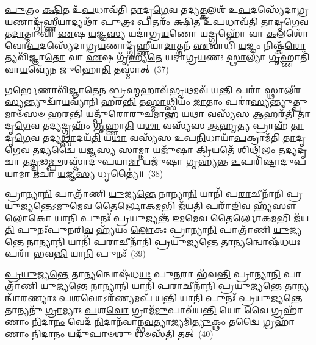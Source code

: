 \-\ul{𑌪𑍁}\-𑌤𑍍𑌰𑌂 \ul{𑌕𑍍𑌷𑌿}\-𑌤 𑌉᳴\-\ul{𑌪}\-𑌧𑌾𑌵᳴𑌤𑌿 \ul{𑌤𑌾}\-𑌦𑍃\-\ul{𑌗𑍇}\-𑌵 𑌤𑌦𑍍𑌯\-\ul{𑌤𑍍𑌕}\-𑌲𑌶᳴ 𑌉\-\ul{𑌪}\-𑌦𑌸𑍍𑌯𑍇᳴𑌦𑌾𑌗𑍍𑌰\-\ul{𑌯}\-𑌣𑌾𑌦𑍍𑌗𑍃᳴𑌹𑍍𑌣𑍀\-\ul{𑌯𑌾}\-𑌦𑍍𑌯𑌥𑌾᳴ \ul{𑌪𑍁}\-𑌤𑍍𑌰𑌃 \ul{𑌪𑌿}\-𑌤𑌰𑌂᳴ \ul{𑌕𑍍𑌷𑌿}\-𑌤 𑌉᳴\-\ul{𑌪}\-𑌧𑌾𑌵᳴𑌤𑌿 \ul{𑌤𑌾}\-𑌦𑍃\-\ul{𑌗𑍇}\-𑌵 𑌤\-\ul{𑌦𑌾}\-𑌤𑍍𑌮𑌾 𑌵𑌾 \ul{𑌏}\-𑌷 \ul{𑌯}\-𑌜𑍍𑌞\-\ul{𑌸𑍍𑌯} 𑌯𑌦𑌾॑𑌗𑍍𑌰\-\ul{𑌯}\-𑌣𑍋 𑌯𑌦𑍍𑌗𑍍𑌰𑌹𑍋᳴ 𑌵𑌾 \ul{𑌕}\-𑌲𑌶𑍋᳴ 𑌵𑍋\-\ul{𑌪}\-𑌦𑌸𑍍𑌯𑍇᳴𑌦𑌾𑌗𑍍𑌰\-\ul{𑌯}\-𑌣𑌾𑌦𑍍𑌗𑍃᳴𑌹𑍍𑌣𑍀𑌯𑌾\-\ul{𑌦𑌾}\-𑌤𑍍𑌮𑌨᳴ \ul{𑌏}\-𑌵𑌾𑌧𑌿᳴ \ul{𑌯}\-𑌜𑍍𑌞𑌂 𑌨𑌿𑌷𑍍𑌕᳴\-\ul{𑌰𑍋}\-𑌤𑍍𑌯𑌵𑌿᳴𑌜𑍍𑌞𑌾\-\ul{𑌤𑍋} 𑌵𑌾 \ul{𑌏}\-𑌷 𑌗𑍃᳴𑌹𑍍𑌯\-\ul{𑌤𑍇} 𑌯𑌦𑌾॑𑌗𑍍𑌰\-\ul{𑌯}\-𑌣𑌃 \ul{𑌸𑍍𑌥𑌾}\-𑌲𑍍𑌯𑌾 \ul{𑌗𑍃}\-𑌹𑍍𑌣𑌾𑌤𑌿᳴ 𑌵𑌾\-\ul{𑌯}\-𑌵𑍍𑌯𑍇᳴𑌨 𑌜𑍁𑌹𑍋\-\ul{𑌤𑌿} 𑌤𑌸𑍍𑌮𑌾॑𑌤𑍍~(37)

𑌗\-\ul{𑌰𑍍𑌭𑍇}\-𑌣𑌾𑌵𑌿᳴𑌜𑍍𑌞𑌾𑌤𑍇𑌨 𑌬𑍍𑌰\-\ul{𑌹𑍍𑌮}\-𑌹𑌾𑌵᳴\-\ul{𑌭𑍃}\-𑌥𑌮𑌵᳴ 𑌯\-\ul{𑌨𑍍𑌤𑌿} 𑌪𑌰𑌾॑ \ul{𑌸𑍍𑌥𑌾}\-𑌲𑍀𑌰\-\ul{𑌸𑍍𑌯}\-𑌨𑍍𑌤𑍍𑌯𑍁𑌦𑍍𑌵𑌾᳴\-\ul{𑌯}\-𑌵𑍍𑌯𑌾᳴𑌨𑌿 𑌹𑌰\-\ul{𑌨𑍍𑌤𑌿} 𑌤\-\ul{𑌸𑍍𑌮𑌾}\-𑌥𑍍𑌸𑍍𑌤𑍍𑌰𑌿𑌯𑌂᳴ \ul{𑌜𑌾}\-𑌤𑌾𑌂 𑌪𑌰𑌾॑\-\ul{𑌸𑍍𑌯}\-𑌨𑍍𑌤𑍍𑌯𑍁\-𑌤𑍍𑌪𑍁𑌮𑌾𑍞᳴𑌸𑍞 𑌹𑌰\-\ul{𑌨𑍍𑌤𑌿} 𑌯𑌤𑍍𑌪𑍁᳴\-\ul{𑌰𑍋}\-𑌰𑍁\-\ul{𑌚}\-𑌮𑌾\-\ul{𑌹} 𑌯\-\ul{𑌥𑌾} 𑌵𑌸𑍍𑌯᳴𑌸 \ul{𑌆}\-𑌹𑌰᳴𑌤𑌿 \ul{𑌤𑌾}\-𑌦𑍃\-\ul{𑌗𑍇}\-𑌵 𑌤𑌦𑍍𑌯𑌦𑍍𑌗𑍍𑌰𑌹𑌂᳴ \ul{𑌗𑍃}\-𑌹𑍍𑌣𑌾\-\ul{𑌤𑌿} 𑌯\-\ul{𑌥𑌾} 𑌵𑌸𑍍𑌯᳴𑌸 \ul{𑌆}\-𑌹𑍃\-\ul{𑌤𑍍𑌯} 𑌪𑍍𑌰𑌾𑌹᳴ \ul{𑌤𑌾}\-𑌦𑍃\-\ul{𑌗𑍇}\-𑌵 𑌤𑌦𑍍𑌯\-\ul{𑌥𑍍𑌸𑌾}\-𑌦𑌯᳴\-\ul{𑌤𑌿} 𑌯\-\ul{𑌥𑌾} 𑌵𑌸𑍍𑌯᳴𑌸 𑌉𑌪\-\ul{𑌨𑌿}\-𑌧𑌾𑌯𑌾᳴\-\ul{𑌪}\-𑌕𑍍𑌰𑌾𑌮᳴𑌤𑌿 \ul{𑌤𑌾}\-𑌦𑍃\-\ul{𑌗𑍇}\-𑌵 𑌤𑌦𑍍𑌯𑌦𑍍𑌵𑍈 \ul{𑌯}\-𑌜𑍍𑌞\-\ul{𑌸𑍍𑌯} 𑌸𑌾\-\ul{𑌮𑍍𑌨𑌾} 𑌯𑌜𑍁᳴𑌷𑌾 \ul{𑌕𑍍𑌰𑌿}\-𑌯𑌤𑍇᳴ 𑌶𑌿\-\ul{𑌥𑌿}\-𑌲𑌂 𑌤𑌦𑍍𑌯\-\ul{𑌦𑍃}\-𑌚𑌾 𑌤\-\ul{𑌦𑍍𑌦𑍃}\-𑌢\-\ul{𑌮𑍍𑌪𑍁}\-𑌰𑌸𑍍𑌤𑌾᳴𑌦𑍁𑌪𑌯𑌾\-\ul{𑌮𑌾} 𑌯𑌜𑍁᳴𑌷𑌾 𑌗𑍃𑌹𑍍𑌯𑌨𑍍𑌤 \ul{𑌉}\-𑌪𑌰𑌿᳴𑌷𑍍𑌟𑌾𑌦𑍁𑌪𑌯𑌾𑌮𑌾 \ul{𑌋}\-𑌚𑌾 \ul{𑌯}\-𑌜𑍍𑌞\-\ul{𑌸𑍍𑌯} 𑌧𑍃𑌤𑍍𑌯𑍈॑॥~(38)

{\anuvakamend[{𑌯𑌥𑌾᳴ \ul{𑌪𑌿}\-𑌤𑌾 𑌤𑌸𑍍𑌮𑌾᳴𑌦\-\ul{𑌪}\-𑌕𑍍𑌰𑌾𑌮᳴𑌤𑌿 \ul{𑌤𑌾}\-𑌦𑍃\-\ul{𑌗𑍇}\-𑌵 𑌤𑌦𑍍𑌯\-\ul{𑌦}\-𑌷𑍍𑌟𑌾𑌦᳴𑌶 𑌚}]}%

𑌪𑍍𑌰𑌾𑌨𑍍𑌯𑌾\-\ul{𑌨𑌿} 𑌪𑌾𑌤𑍍𑌰𑌾᳴𑌣𑌿 \ul{𑌯𑍁}\-𑌜𑍍𑌯\-\ul{𑌨𑍍𑌤𑍇} 𑌨𑌾𑌨𑍍𑌯𑌾\-\ul{𑌨𑌿} 𑌯𑌾𑌨𑌿᳴ 𑌪\-\ul{𑌰𑌾}\-𑌚𑍀𑌨𑌾᳴𑌨𑌿 𑌪𑍍𑌰\-\ul{𑌯𑍁}\-𑌜𑍍𑌯\-\ul{𑌨𑍍𑌤𑍇}\-\-𑌽𑌮𑍁\-\ul{𑌮𑍇}\-𑌵 𑌤𑍈\-\ul{𑌰𑍍𑌲𑍋}\-𑌕\-\ul{𑌮}\-𑌭𑌿 𑌜᳴𑌯\-\ul{𑌤𑌿} 𑌪𑌰𑌾᳴𑌙𑌿\-\ul{𑌵} 𑌹𑍍𑌯᳴𑌸𑍗 \ul{𑌲𑍋}\-𑌕𑍋 𑌯𑌾\-\ul{𑌨𑌿} 𑌪𑍁𑌨𑌃᳴ 𑌪𑍍𑌰\-\ul{𑌯𑍁}\-𑌜𑍍𑌯𑌨𑍍𑌤᳴ \ul{𑌇}\-𑌮\-\ul{𑌮𑍇}\-𑌵 𑌤𑍈\-\ul{𑌰𑍍𑌲𑍋}\-𑌕\-\ul{𑌮}\-𑌭𑌿 𑌜᳴𑌯\-\ul{𑌤𑌿} 𑌪𑍁𑌨𑌃᳴𑌪𑍁𑌨𑌰𑌿\-\ul{𑌵} 𑌹𑍍𑌯᳴𑌯𑌂 \ul{𑌲𑍋}\-𑌕𑌃 𑌪𑍍𑌰𑌾𑌨𑍍𑌯𑌾\-\ul{𑌨𑌿} 𑌪𑌾𑌤𑍍𑌰𑌾᳴𑌣𑌿 \ul{𑌯𑍁}\-𑌜𑍍𑌯\-\ul{𑌨𑍍𑌤𑍇} 𑌨𑌾𑌨𑍍𑌯𑌾\-\ul{𑌨𑌿} 𑌯𑌾𑌨𑌿᳴ 𑌪\-\ul{𑌰𑌾}\-𑌚𑍀𑌨𑌾᳴𑌨𑌿 𑌪𑍍𑌰\-\ul{𑌯𑍁}\-𑌜𑍍𑌯\-\ul{𑌨𑍍𑌤𑍇} 𑌤𑌾𑌨𑍍𑌯𑌨𑍍𑌵𑍋𑌷᳴𑌧\-\ul{𑌯𑌃} 𑌪𑌰𑌾᳴ 𑌭𑌵\-\ul{𑌨𑍍𑌤𑌿} 𑌯𑌾\-\ul{𑌨𑌿} 𑌪𑍁𑌨𑌃᳴~(39)

\-\ul{𑌪𑍍𑌰}\-\-\ul{𑌯𑍁}\-𑌜𑍍𑌯\-\ul{𑌨𑍍𑌤𑍇} 𑌤𑌾𑌨𑍍𑌯𑌨𑍍𑌵𑍋𑌷᳴𑌧\-\ul{𑌯𑌃} 𑌪𑍁\-\ul{𑌨}\-𑌰𑌾 𑌭᳴𑌵\-\ul{𑌨𑍍𑌤𑌿} 𑌪𑍍𑌰𑌾𑌨𑍍𑌯𑌾\-\ul{𑌨𑌿} 𑌪𑌾𑌤𑍍𑌰𑌾᳴𑌣𑌿 \ul{𑌯𑍁}\-𑌜𑍍𑌯\-\ul{𑌨𑍍𑌤𑍇} 𑌨𑌾𑌨𑍍𑌯𑌾\-\ul{𑌨𑌿} 𑌯𑌾𑌨𑌿᳴ 𑌪\-\ul{𑌰𑌾}\-𑌚𑍀𑌨𑌾᳴𑌨𑌿 𑌪𑍍𑌰\-\ul{𑌯𑍁}\-𑌜𑍍𑌯\-\ul{𑌨𑍍𑌤𑍇} 𑌤𑌾𑌨𑍍𑌯𑌨𑍍𑌵𑌾᳴\-\ul{𑌰}\-𑌣𑍍𑌯𑌾𑌃 \ul{𑌪}\-𑌶𑌵𑍋\-𑌽𑌰᳴\-\ul{𑌣𑍍𑌯}\-𑌮𑌪᳴ 𑌯\-\ul{𑌨𑍍𑌤𑌿} 𑌯𑌾\-\ul{𑌨𑌿} 𑌪𑍁𑌨𑌃᳴ 𑌪𑍍𑌰\-\ul{𑌯𑍁}\-𑌜𑍍𑌯\-\ul{𑌨𑍍𑌤𑍇} 𑌤𑌾𑌨𑍍𑌯𑌨𑍁᳴ \ul{𑌗𑍍𑌰𑌾}\-𑌮𑍍𑌯𑌾𑌃 \ul{𑌪}\-𑌶\-\ul{𑌵𑍋} 𑌗𑍍𑌰𑌾𑌮᳴\-\ul{𑌮𑍁}\-𑌪𑌾𑌵᳴𑌯\-\ul{𑌨𑍍𑌤𑌿} 𑌯𑍋 𑌵𑍈 𑌗𑍍𑌰𑌹𑌾᳴𑌣𑌾𑌂 \ul{𑌨𑌿}\-𑌦𑌾\-\ul{𑌨𑌂} 𑌵𑍇𑌦᳴ \ul{𑌨𑌿}\-𑌦𑌾𑌨᳴𑌵𑌾𑌨𑍍𑌭\-\ul{𑌵}\-𑌤𑍍𑌯𑌾\-\ul{𑌜𑍍𑌯}\-𑌮𑌿\-\ul{𑌤𑍍𑌯𑍁}\-𑌕𑍍𑌥𑌂 𑌤𑌦𑍍𑌵𑍈 𑌗𑍍𑌰𑌹𑌾᳴𑌣𑌾𑌂 \ul{𑌨𑌿}\-𑌦𑌾\-\ul{𑌨𑌂} 𑌯𑌦𑍁᳴\-\ul{𑌪𑌾}\-\-\ul{𑍞}\-𑌶𑍁 𑌶𑍞𑌸᳴\-\ul{𑌤𑌿} 𑌤𑌤𑍍~(40)

